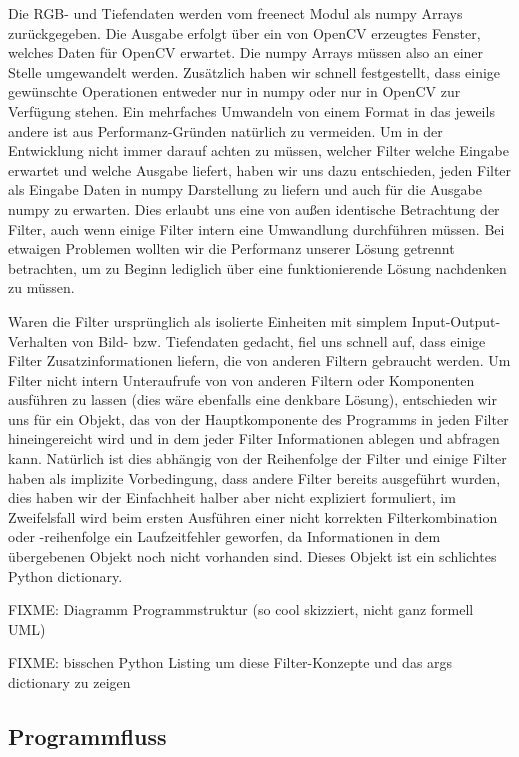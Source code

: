 \documentclass[12pt,a4paper,ngerman]{scrartcl}
\begin{document}
Die RGB- und Tiefendaten werden vom freenect Modul als numpy Arrays zurückgegeben.
Die Ausgabe erfolgt über ein von OpenCV erzeugtes Fenster, welches Daten für 
OpenCV erwartet. Die numpy Arrays müssen also an einer Stelle umgewandelt werden.
Zusätzlich haben wir schnell festgestellt, dass einige gewünschte Operationen 
entweder nur in numpy oder nur in OpenCV zur Verfügung stehen. Ein mehrfaches 
Umwandeln von einem Format in das jeweils andere ist aus Performanz-Gründen 
natürlich zu vermeiden. Um in der Entwicklung nicht immer darauf achten zu müssen,
welcher Filter welche Eingabe erwartet und welche Ausgabe liefert, haben wir uns dazu
entschieden, jeden Filter als Eingabe Daten in numpy Darstellung zu liefern und auch
für die Ausgabe numpy zu erwarten. Dies erlaubt uns eine von außen identische 
Betrachtung der Filter, auch wenn einige Filter intern eine Umwandlung durchführen 
müssen. Bei etwaigen Problemen wollten wir die Performanz unserer Lösung getrennt
betrachten, um zu Beginn lediglich über eine funktionierende Lösung nachdenken
zu müssen.

Waren die Filter ursprünglich als isolierte Einheiten mit simplem 
Input-Output-Verhalten von Bild- bzw. Tiefendaten gedacht, fiel uns schnell auf,
dass einige Filter Zusatzinformationen liefern, die von anderen Filtern gebraucht 
werden. Um Filter nicht intern Unteraufrufe von von anderen Filtern oder Komponenten
ausführen zu lassen (dies wäre ebenfalls eine denkbare Lösung), entschieden wir uns
für ein Objekt, das von der Hauptkomponente des Programms in jeden Filter 
hineingereicht wird und in dem jeder Filter Informationen ablegen und abfragen kann.
Natürlich ist dies abhängig von der Reihenfolge der Filter und einige Filter haben 
als implizite Vorbedingung, dass andere Filter bereits ausgeführt wurden, dies haben
wir der Einfachheit halber aber nicht expliziert formuliert, im Zweifelsfall wird 
beim ersten Ausführen einer nicht korrekten Filterkombination oder -reihenfolge ein
Laufzeitfehler geworfen, da Informationen in dem übergebenen Objekt noch nicht 
vorhanden sind. Dieses Objekt ist ein schlichtes Python dictionary.


FIXME: Diagramm Programmstruktur (so cool skizziert, nicht ganz formell UML)

FIXME: bisschen Python Listing um diese Filter-Konzepte und das args dictionary zu zeigen


\subsection{Programmfluss}
\end{document}
